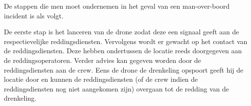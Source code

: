 De stappen die men moet ondernemen in het geval van een man-over-boord incident is als volgt.

De eerste stap is het lanceren van de drone zodat deze een signaal geeft aan de respectievelijke reddingsdiensten. Vervolgens wordt er gewacht op het contact van de reddingsdiensten. Deze hebben ondertussen de locatie reeds doorgegeven aan de reddingsoperatoren. Verder advies kan gegeven worden door de reddingsdiensten aan de crew. Eens de drone de drenkeling opspoort geeft hij de locatie door en kunnen de reddingsdiensten (of de crew indien de reddingsdiensten nog niet aangekomen zijn) overgaan tot de redding van de drenkeling.

 

